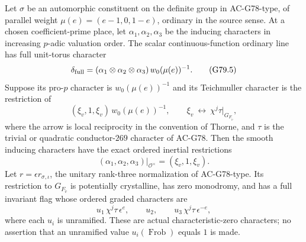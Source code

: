 \begin{lemma}
\label{lem:G79-flag}
Let \(\sigma\) be an automorphic constituent on the definite
group in AC-G78-type, of parallel weight
\(\mu(e)=(e-1,0,1-e)\), ordinary in the source sense.
At a chosen coefficient-prime place, let
\(\alpha_1,\alpha_2,\alpha_3\) be the inducing characters in
increasing \(p\)-adic valuation order.  The scalar
continuous-function ordinary line has full unit-torus
character
\[
       \delta_{\rm full}
          =(\alpha_1\otimes\alpha_2\otimes\alpha_3)
                              \,w_0(\mu(e))^{-1}.
 \tag{G79.5}
\]
Suppose its pro-\(p\) character is \(w_0(\mu(e))^{-1}\)
and its Teichmuller character is the restriction of
\[
       (\xi_v,1,\xi_v)\,w_0(\mu(e))^{-1},
 \qquad
       \xi_v\ \longleftrightarrow\
                 \chi^j\tau|_{G_{F_{\widetilde v}}},
 \tag{G79.6}
\]
where the arrow is local reciprocity in the convention of
Thorne, and \(\tau\) is the trivial or quadratic conductor-\(269\)
character of AC-G78.
Then the smooth inducing characters have the exact ordered
inertial restrictions
\[
                (\alpha_1,\alpha_2,\alpha_3)|_{\mathcal O^\times}
                           =(\xi_v,1,\xi_v).           \tag{G79.7}
\]
Let \(r=\epsilon r_{\sigma,\iota}\), the unitary rank-three
normalization of AC-G78-type.  Its restriction to
\(G_{F_{\widetilde v}}\) is potentially crystalline, has
zero monodromy, and has a full invariant flag whose ordered
graded characters are
\[
 u_1\,\chi^j\tau\,\epsilon^e,\qquad
 u_2,\qquad
 u_3\,\chi^j\tau\,\epsilon^{-e},
 \tag{G79.8}
\]
where each \(u_i\) is unramified.  These are actual
characteristic-zero characters; no assertion that an
unramified value \(u_i(\operatorname{Frob})\) equals \(1\)
is made.
\end{lemma}

